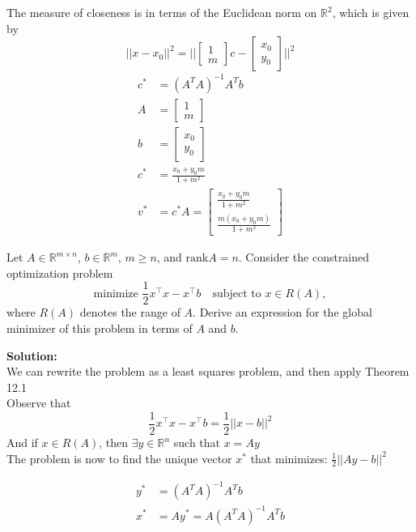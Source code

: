 \documentclass{article}
\begin{document}
\begin{enumerate}
The measure of closeness is in terms of the Euclidean norm on $\mathbb{R}^2$, which is given by $$||x - x_0||^2 = ||\begin{bmatrix} 1 \\ m \end{bmatrix}c - \begin{bmatrix} x_0 \\ y_0 \end{bmatrix}||^2$$
\begin{align*}
    c^* &= (A^TA)^{-1} A^T b \\
    A &= \begin{bmatrix}
        1\\ m
    \end{bmatrix} \\ b&=\begin{bmatrix}
        x_0 \\ y_0
    \end{bmatrix} \\
    c^* &= \frac{x_0+y_0m}{1+m^2} \\
    v^* &= c^*A = \begin{bmatrix}
        \frac{x_0+y_0m}{1+m^2} \\ \frac{m(x_0+y_0m)}{1+m^2}
    \end{bmatrix}
\end{align*}


\bigbreak

\begin{bb}
    \item 
    Let $A \in \mathbb{R}^{m \times n}$, $b \in \mathbb{R}^m$, $m \geq n$, and $\text{rank} A = n$. Consider the constrained optimization problem
    \[
    \text{minimize } \frac{1}{2} x^\top x - x^\top b \quad \text{subject to } x \in R(A),
    \]
    where $R(A)$ denotes the range of $A$. Derive an expression for the global minimizer of this problem in terms of $A$ and $b$.    
\end{bb}
\textbf{Solution:}\\
We can rewrite the problem as a least squares problem, and then apply Theorem 12.1 \\
Observe that $$ \frac{1}{2} x^\top x - x^\top b = \frac{1}{2}||x-b||^2 $$
And if $x \in R(A)$, then $\exists y \in \mathbb{R}^n$ such that $x = Ay$ \\
The problem is now to find the unique vector $x^*$ that minimizes:  $\frac{1}{2}||Ay-b||^2$

\begin{align*}
    y^* &= (A^TA)^{-1} A^T b \\
    x^* &= Ay^* = A \left( A^TA \right)^{-1} A^T b    
\end{align*}


\end{enumerate}
\end{document}
